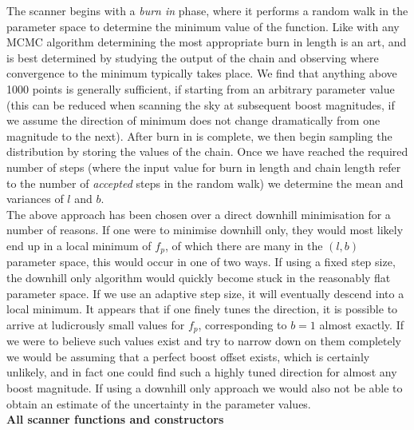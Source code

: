 \documentclass[11pt]{article}
\begin{document}
The scanner begins with a \textit{burn in} phase, where it performs a random walk in the parameter space to determine the minimum value of the function.  Like with any MCMC algorithm determining the most appropriate burn in length is an art, and is best determined by studying the output of the chain and observing where convergence to the minimum typically takes place.  We find that anything above 1000 points is generally sufficient, if starting from an arbitrary parameter value (this can be reduced when scanning the sky at subsequent boost magnitudes, if we assume the direction of minimum does not change dramatically from one magnitude to the next).  After burn in is complete, we then begin sampling the distribution by storing the values of the chain.  Once we have reached the required number of steps (where the input value for burn in length and chain length refer to the number of \textit{accepted} steps in the random walk) we determine the mean and variances of $l$ and $b$.\\

The above approach has been chosen over a direct downhill minimisation for a number of reasons.  If one were to minimise downhill only, they would most likely end up in a local minimum of $f_p$, of which there are many in the $(l,b)$ parameter space, this would occur in one of two ways.  If using a fixed step size, the downhill only algorithm would quickly become stuck in the reasonably flat parameter space.  If we use an adaptive step size, it will eventually descend into a local minimum.  It appears that if one finely tunes the direction, it is possible to arrive at ludicrously small values for $f_p$, corresponding to $b=1$ almost exactly.  If we were to believe such values exist and try to narrow down on them completely we would be assuming that a perfect boost offset exists, which is certainly unlikely, and in fact one could find such a highly tuned direction for almost any boost magnitude.  If using a downhill only approach we would also not be able to obtain an estimate of the uncertainty in the parameter values.\\


\textbf{All scanner functions and constructors}\\
\end{document}
